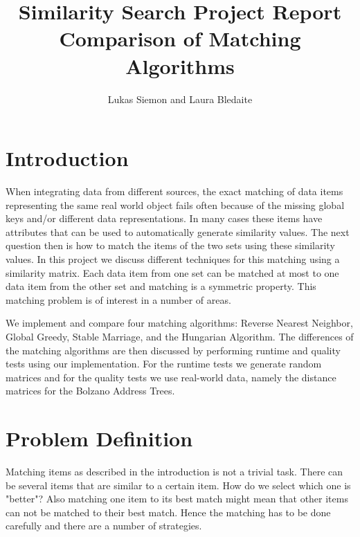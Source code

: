 \documentclass[a4paper,11pt]{article}
\newcommand\etc{\textsl{etc}}
\begin{document}
\title{
  \textbf{\large Similarity Search Project Report}\\
  Comparison of Matching Algorithms
}

\author{Lukas Siemon and Laura Bledaite}
\maketitle


\section{Introduction}

When integrating data from different sources, the exact matching of data items representing the same real world object fails often because of the missing global keys and/or different data representations. In many cases these items have attributes that can be used to automatically generate similarity values. The next question then is how to match the items of the two sets using these similarity values. In this project we discuss different techniques for this matching using a similarity matrix. Each data item from one set can be matched at most to one data item from the other set and matching is a symmetric property. This matching problem is of interest in a number of areas.

We implement and compare four matching algorithms: Reverse Nearest Neighbor, Global Greedy, Stable Marriage, and the Hungarian Algorithm. 
The differences of the matching algorithms are then discussed by performing runtime and quality tests using our implementation. For the runtime tests we generate random matrices and for the quality tests we use real-world data, namely the distance matrices for the Bolzano Address Trees.

 

\section{Problem Definition}
Matching items as described in the introduction is not a trivial task. There can be several items that are similar to a certain item. How do we select which one is "better"? Also matching one item to its best match might mean that other items can not be matched to their best match. Hence the matching has to be done carefully and there are a number of strategies.
\end{document}
